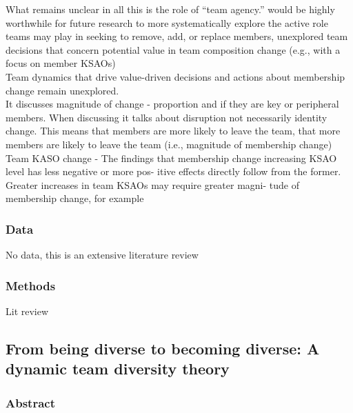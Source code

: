 \documentclass[12pt]{article}
\begin{document}
What remains unclear in all this is the role of “team agency.”  would be highly worthwhile for future research to more systematically explore the active role teams may play in seeking to remove, add, or replace members, unexplored team decisions that concern potential value in team composition change (e.g., with a focus on member KSAOs) \\

Team dynamics that drive value-driven decisions and actions about membership change remain unexplored. \\

It discusses magnitude of change - proportion and if they are key or peripheral members. When discussing it talks about disruption not necessarily identity change. This means that members are more likely to leave the team, that more members are likely to leave the team (i.e., magnitude of membership change) \\

Team KASO change - The findings that membership change increasing KSAO level has less negative or more pos- itive effects directly follow from the former. Greater increases in team KSAOs may require greater magni- tude of membership change, for example


\subsubsection*{Data}

No data, this is an extensive literature review

\subsubsection*{Methods}

Lit review


\subsection*{From being diverse to becoming diverse: A dynamic team diversity theory\cite{diverse_to_becoming_diverse}}

\subsubsection*{Abstract}
\end{document}

